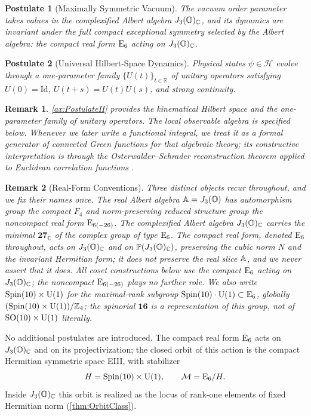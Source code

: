 \documentclass[pdflatex,sn-mathphys-num]{sn-jnl}
\theoremstyle{thmstyleone}
\newtheorem{postulate}[postulate]{Postulate}
\theoremstyle{thmstylethree}%
\theoremstyle{thmstyletwo}%
\newtheorem{remark}[remark]{Remark}
\begin{document}
\begin{postulate}[Maximally Symmetric Vacuum]\label{ax:PostulateI}
The vacuum order parameter takes values in the complexified Albert algebra
$J_3(\mathbb{O})_{\mathbb C}$, and its dynamics are invariant under the full compact exceptional
symmetry selected by the Albert algebra: the compact real form $\mathrm{E}_{6}$ acting
on $J_3(\mathbb{O})_{\mathbb C}$.
\end{postulate}
\begin{postulate}[Universal Hilbert-Space Dynamics]\label{ax:PostulateII}
Physical states $\psi\in\mathcal H$ evolve through a one-parameter family
$\{U(t)\}_{t\in\mathbb R}$ of unitary operators satisfying
$U(0)=\mathrm{Id}$, $U(t+s)=U(t)U(s)$, and strong continuity.
\end{postulate}

\begin{remark}
\autoref{ax:PostulateII} provides the kinematical Hilbert space and the
one-parameter family of unitary operators. The local observable algebra is
specified below. Whenever we later write a
functional integral, we treat it as a formal generator of connected Green
functions for that algebraic theory; its constructive interpretation is through
the Osterwalder--Schrader reconstruction theorem applied to Euclidean
correlation functions \cite{GlimmJaffe:1987}.
\end{remark}


\begin{remark}[Real-Form Conventions]\label{rmk:RealForms}
Three distinct objects recur throughout, and we fix their names once. The real
Albert algebra $\mathbb{A}=J_3(\mathbb{O})$ has automorphism group the compact $F_4$
and norm-preserving reduced structure group the noncompact real form
$\mathrm{E}_{6(-26)}$. The complexified Albert algebra $J_3(\mathbb{O})_{\mathbb C}$ carries the minimal
$\mathbf{27}_{\mathbb C}$ of the complex group of type $\mathrm{E}_6$. The compact
real form, denoted $\mathrm{E}_{6}$ throughout, acts on $J_3(\mathbb{O})_{\mathbb C}$ and on
$\mathbb P(J_3(\mathbb{O})_{\mathbb C})$, preserving the cubic norm $N$ and the invariant
Hermitian form; it does not preserve the real slice $\mathbb{A}$, and we never
assert that it does. All coset constructions below use the compact $\mathrm{E}_{6}$
acting on $J_3(\mathbb{O})_{\mathbb C}$; the noncompact $\mathrm{E}_{6(-26)}$ plays no further role. We
also write $\operatorname{Spin}(10) \times \mathrm{U(1)}$ for the maximal-rank subgroup
$\operatorname{Spin}(10)\cdot\mathrm{U(1)}\subset\mathrm{E}_{6}$, globally
$(\operatorname{Spin}(10)\times\mathrm{U(1)})/\mathbb Z_4$; the spinorial $\mathbf{16}$ is a
representation of this group, not of $\mathrm{SO(10)}\times\mathrm{U(1)}$ literally.
\end{remark}

No additional postulates are introduced. The compact real form \(\mathrm{E}_{6}\)
acts on \(J_3(\mathbb{O})_{\mathbb C}\) and on its projectivization; the closed orbit of this
action is the compact Hermitian symmetric space EIII, with stabilizer
\[
  H=\operatorname{Spin}(10) \times \mathrm{U(1)},
  \qquad
  \mathcal{M}=\mathrm{E}_{6}/H.
\]
Inside \(J_3(\mathbb{O})_{\mathbb C}\) this orbit is realized as the locus of rank-one elements
of fixed Hermitian norm (\autoref{thm:OrbitClass}).
\end{document}
